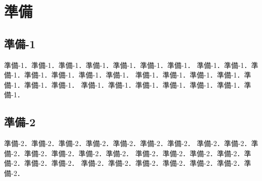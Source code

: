 \chapter{準備}

\section{準備-1}

準備-1．準備-1．準備-1．準備-1．準備-1．準備-1．準備-1．
準備-1．準備-1．準備-1．準備-1．準備-1．準備-1．準備-1．
準備-1．準備-1．準備-1．準備-1．準備-1．準備-1．準備-1．
準備-1．準備-1．準備-1．準備-1．準備-1．準備-1．準備-1．


\section{準備-2}

準備-2．準備-2．準備-2．準備-2．準備-2．準備-2．準備-2．
準備-2．準備-2．準備-2．準備-2．準備-2．準備-2．準備-2．
準備-2．準備-2．準備-2．準備-2．準備-2．準備-2．準備-2．
準備-2．準備-2．準備-2．準備-2．準備-2．準備-2．準備-2．
